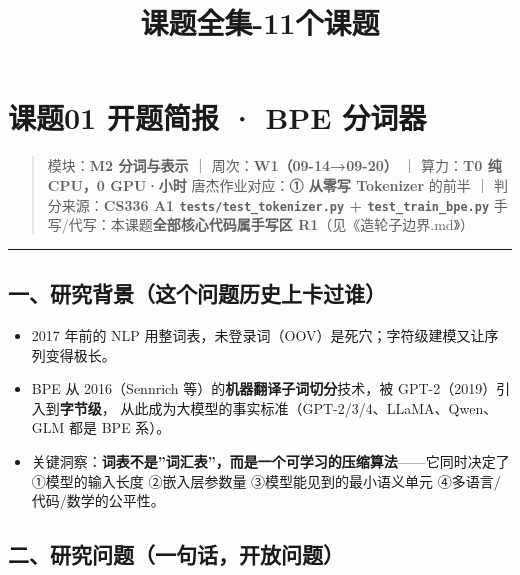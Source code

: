 \documentclass[
  chinese,
  11pt,
]{ctexart}
\title{课题全集-11个课题}
\author{}
\date{}
\providecommand{\tightlist}{%
  \setlength{\itemsep}{0pt}\setlength{\parskip}{0pt}}
\begin{document}
\maketitle

{
\setcounter{tocdepth}{2}
\tableofcontents
}
\section{课题01 开题简报 · BPE 分词器}\label{ux8bfeux989801-ux5f00ux9898ux7b80ux62a5-bpe-ux5206ux8bcdux5668}

\begin{quote}
模块：\textbf{M2 分词与表示} ｜ 周次：\textbf{W1（09-14→09-20）} ｜ 算力：\textbf{T0 纯 CPU，0 GPU·小时} 唐杰作业对应：\textbf{① 从零写 Tokenizer} 的前半 ｜ 判分来源：\textbf{CS336 A1 \texttt{tests/test\_tokenizer.py} + \texttt{test\_train\_bpe.py}} 手写/代写：本课题\textbf{全部核心代码属手写区 R1}（见《造轮子边界.md》）
\end{quote}

\begin{center}\rule{0.5\linewidth}{0.5pt}\end{center}

\subsection{一、研究背景（这个问题历史上卡过谁）}\label{ux4e00ux7814ux7a76ux80ccux666fux8fd9ux4e2aux95eeux9898ux5386ux53f2ux4e0aux5361ux8fc7ux8c01}

\begin{itemize}
\tightlist
\item
  2017 年前的 NLP 用整词表，未登录词（OOV）是死穴；字符级建模又让序列变得极长。
\item
  BPE 从 2016（Sennrich 等）的\textbf{机器翻译子词切分}技术，被 GPT-2（2019）引入到\textbf{字节级}， 从此成为大模型的事实标准（GPT-2/3/4、LLaMA、Qwen、GLM 都是 BPE 系）。
\item
  关键洞察：\textbf{词表不是''词汇表''，而是一个可学习的压缩算法}------它同时决定了 ①模型的输入长度 ②嵌入层参数量 ③模型能见到的最小语义单元 ④多语言/代码/数学的公平性。
\end{itemize}

\subsection{二、研究问题（一句话，开放问题）}\label{ux4e8cux7814ux7a76ux95eeux9898ux4e00ux53e5ux8bddux5f00ux653eux95eeux9898}
\end{document}
